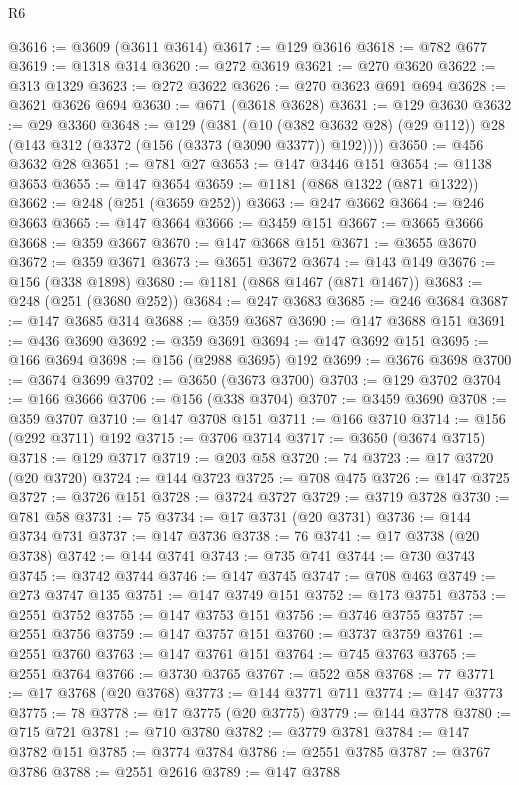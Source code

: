 \begin{lexlean}{R6}
\begin{coremodule}
@3616 := @3609 (@3611 @3614)
@3617 := @129 @3616
@3618 := @782 @677
@3619 := @1318 @314
@3620 := @272 @3619
@3621 := @270 @3620
@3622 := @313 @1329
@3623 := @272 @3622
@3626 := @270 @3623 @691 @694
@3628 := @3621 @3626 @694
@3630 := @671 (@3618 @3628)
@3631 := @129 @3630
@3632 := @29 @3360
@3648 := @129
    (@381
      (@10 (@382 @3632 @28) (@29 @112))
      @28
      (@143 @312 (@3372 (@156 (@3373 (@3090 @3377)) @192))))
@3650 := @456 @3632 @28
@3651 := @781 @27
@3653 := @147 @3446 @151
@3654 := @1138 @3653
@3655 := @147 @3654
@3659 := @1181 (@868 @1322 (@871 @1322))
@3662 := @248 (@251 (@3659 @252))
@3663 := @247 @3662
@3664 := @246 @3663
@3665 := @147 @3664
@3666 := @3459 @151
@3667 := @3665 @3666
@3668 := @359 @3667
@3670 := @147 @3668 @151
@3671 := @3655 @3670
@3672 := @359 @3671
@3673 := @3651 @3672
@3674 := @143 @149
@3676 := @156 (@338 @1898)
@3680 := @1181 (@868 @1467 (@871 @1467))
@3683 := @248 (@251 (@3680 @252))
@3684 := @247 @3683
@3685 := @246 @3684
@3687 := @147 @3685 @314
@3688 := @359 @3687
@3690 := @147 @3688 @151
@3691 := @436 @3690
@3692 := @359 @3691
@3694 := @147 @3692 @151
@3695 := @166 @3694
@3698 := @156 (@2988 @3695) @192
@3699 := @3676 @3698
@3700 := @3674 @3699
@3702 := @3650 (@3673 @3700)
@3703 := @129 @3702
@3704 := @166 @3666
@3706 := @156 (@338 @3704)
@3707 := @3459 @3690
@3708 := @359 @3707
@3710 := @147 @3708 @151
@3711 := @166 @3710
@3714 := @156 (@292 @3711) @192
@3715 := @3706 @3714
@3717 := @3650 (@3674 @3715)
@3718 := @129 @3717
@3719 := @203 @58
@3720 := 74
@3723 := @17 @3720 (@20 @3720)
@3724 := @144 @3723
@3725 := @708 @475
@3726 := @147 @3725
@3727 := @3726 @151
@3728 := @3724 @3727
@3729 := @3719 @3728
@3730 := @781 @58
@3731 := 75
@3734 := @17 @3731 (@20 @3731)
@3736 := @144 @3734 @731
@3737 := @147 @3736
@3738 := 76
@3741 := @17 @3738 (@20 @3738)
@3742 := @144 @3741
@3743 := @735 @741
@3744 := @730 @3743
@3745 := @3742 @3744
@3746 := @147 @3745
@3747 := @708 @463
@3749 := @273 @3747 @135
@3751 := @147 @3749 @151
@3752 := @173 @3751
@3753 := @2551 @3752
@3755 := @147 @3753 @151
@3756 := @3746 @3755
@3757 := @2551 @3756
@3759 := @147 @3757 @151
@3760 := @3737 @3759
@3761 := @2551 @3760
@3763 := @147 @3761 @151
@3764 := @745 @3763
@3765 := @2551 @3764
@3766 := @3730 @3765
@3767 := @522 @58
@3768 := 77
@3771 := @17 @3768 (@20 @3768)
@3773 := @144 @3771 @711
@3774 := @147 @3773
@3775 := 78
@3778 := @17 @3775 (@20 @3775)
@3779 := @144 @3778
@3780 := @715 @721
@3781 := @710 @3780
@3782 := @3779 @3781
@3784 := @147 @3782 @151
@3785 := @3774 @3784
@3786 := @2551 @3785
@3787 := @3767 @3786
@3788 := @2551 @2616
@3789 := @147 @3788

\end{coremodule}
\end{lexlean}
